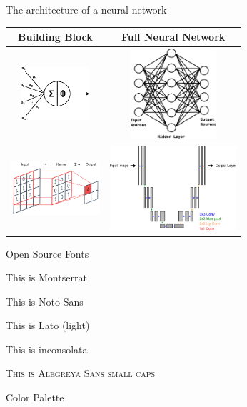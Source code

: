 \begin{frame}{The architecture of a neural network}
   \centering
   \renewcommand{\arraystretch}{1.5}
   \begin{tabular}{c|c}
      \Large{Building Block} & \Large{Full Neural Network} \\ \hline \pause
      \includegraphics[width=1in, valign=m,margin = 1pt]{images/neuron.png} & \includegraphics[width=1.25in, valign=m, margin = 1pt]{images/fcn.png} \\ \hline \pause 
      \includegraphics[width = 1.3in, valign=m, margin = 1pt]{images/2d-convolution.png} & \includegraphics[width=1.85in, valign=m, margin = 1pt]{images/u-net.png}
   \end{tabular}
\end{frame}

\begin{frame}{Open Source Fonts}
 \begin{fullpageitemize}
  \item {\montserratfont This is Montserrat}
  \item {\notosansfont This is Noto Sans}
  \item {\latolightfont This is Lato (light)}
  \item {\inconsolatafont This is inconsolata}
  \item \textsc{This is Alegreya Sans small caps}
 \end{fullpageitemize}
\end{frame}
\begin{frame}{Color Palette}
 \begin{center}
  \crule[colordgray] \crule[colorhgray] \crule[colorblue] \crule[colorgreen] \crule[colororange]
 \end{center}
\end{frame}


